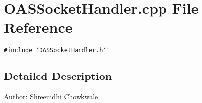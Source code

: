 \section{OASSocket\-Handler.cpp File Reference}
\label{OASSocketHandler_8cpp}
{\tt \#include \char`\"{}OASSocket\-Handler.h\char`\"{}}\par


\subsection{Detailed Description}
\begin{Desc}
\item[Author:]Shreenidhi Chowkwale \end{Desc}
